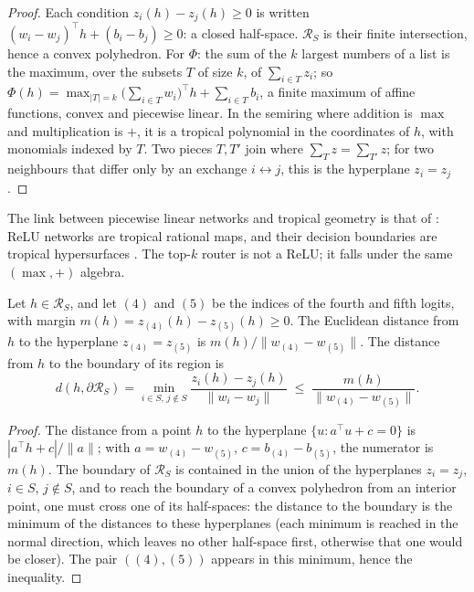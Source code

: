 \begin{proof}
Each condition $z_i(h) - z_j(h) \ge 0$ is written $(w_i - w_j)^{\top} h + (b_i - b_j) \ge 0$: a closed half-space. $\mathcal{R}_S$ is their finite intersection, hence a convex polyhedron. For $\Phi$: the sum of the $k$ largest numbers of a list is the maximum, over the subsets $T$ of size $k$, of $\sum_{i \in T} z_i$; so $\Phi(h) = \max_{|T| = k} \bigl(\sum_{i \in T} w_i\bigr)^{\top} h + \sum_{i \in T} b_i$, a finite maximum of affine functions, convex and piecewise linear. In the semiring where addition is $\max$ and multiplication is $+$, it is a tropical polynomial in the coordinates of $h$, with monomials indexed by $T$. Two pieces $T, T'$ join where $\sum_T z = \sum_{T'} z$; for two neighbours that differ only by an exchange $i \leftrightarrow j$, this is the hyperplane $z_i = z_j$.
\end{proof}

The link between piecewise linear networks and tropical geometry is that of \textcite{zhang2018tropical}: ReLU networks are tropical rational maps, and their decision boundaries are tropical hypersurfaces \litt. The top-$k$ router is not a ReLU; it falls under the same $(\max, +)$ algebra.

\begin{proposition}\label{t3syn:prop:marge}
Let $h \in \mathcal{R}_S$, and let $(4)$ and $(5)$ be the indices of the fourth and fifth logits, with margin $m(h) = z_{(4)}(h) - z_{(5)}(h) \ge 0$. The Euclidean distance from $h$ to the hyperplane $z_{(4)} = z_{(5)}$ is $m(h)/\|w_{(4)} - w_{(5)}\|$. The distance from $h$ to the boundary of its region is
\[
d(h, \partial\mathcal{R}_S) = \min_{i \in S,\, j \notin S} \frac{z_i(h) - z_j(h)}{\|w_i - w_j\|} \;\le\; \frac{m(h)}{\|w_{(4)} - w_{(5)}\|}.
\]
\end{proposition}

\begin{proof}
The distance from a point $h$ to the hyperplane $\{u : a^{\top}u + c = 0\}$ is $|a^{\top}h + c|/\|a\|$; with $a = w_{(4)} - w_{(5)}$, $c = b_{(4)} - b_{(5)}$, the numerator is $m(h)$. The boundary of $\mathcal{R}_S$ is contained in the union of the hyperplanes $z_i = z_j$, $i \in S$, $j \notin S$, and to reach the boundary of a convex polyhedron from an interior point, one must cross one of its half-spaces: the distance to the boundary is the minimum of the distances to these hyperplanes (each minimum is reached in the normal direction, which leaves no other half-space first, otherwise that one would be closer). The pair $((4), (5))$ appears in this minimum, hence the inequality.
\end{proof}

